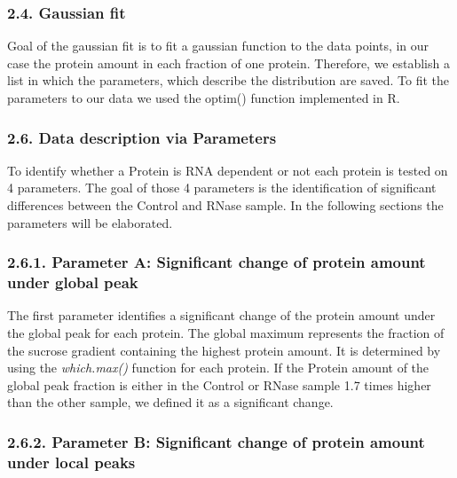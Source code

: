\documentclass[
  12pt,
]{article}
\begin{document}
\hypertarget{gaussian-fit}{%
\subsubsection{2.4. Gaussian fit}\label{gaussian-fit}}

Goal of the gaussian fit is to fit a gaussian function to the data
points, in our case the protein amount in each fraction of one protein.
Therefore, we establish a list in which the parameters, which describe
the distribution are saved. To fit the parameters to our data we used
the optim() function implemented in R.

\hypertarget{data-description-via-parameters}{%
\subsubsection{2.6. Data description via
Parameters}\label{data-description-via-parameters}}

To identify whether a Protein is RNA dependent or not each protein is
tested on 4 parameters. The goal of those 4 parameters is the
identification of significant differences between the Control and RNase
sample. In the following sections the parameters will be elaborated.

\hypertarget{parameter-a-significant-change-of-protein-amount-under-global-peak}{%
\subsubsection{2.6.1. Parameter A: Significant change of protein amount
under global
peak}\label{parameter-a-significant-change-of-protein-amount-under-global-peak}}

The first parameter identifies a significant change of the protein
amount under the global peak for each protein. The global maximum
represents the fraction of the sucrose gradient containing the highest
protein amount. It is determined by using the \emph{which.max()}
function for each protein. If the Protein amount of the global peak
fraction is either in the Control or RNase sample 1.7 times higher than
the other sample, we defined it as a significant change.

\hypertarget{parameter-b-significant-change-of-protein-amount-under-local-peaks}{%
\subsubsection{2.6.2. Parameter B: Significant change of protein amount
under local
peaks}\label{parameter-b-significant-change-of-protein-amount-under-local-peaks}}
\end{document}
